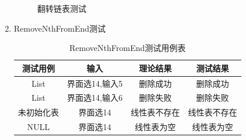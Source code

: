 \documentclass[supercite]{HustGraduPaper}
\theoremstyle{definition}
\begin{document}
\begin{enumerate}
\begin{figure}[htb]
		      \caption{翻转链表测试}
	      \end{figure}
	      \newpage
	\item RemoveNthFromEnd测试
	      \begin{table}[htb]
		      \begin{center}
			      \setlength{\tabcolsep}{2.0mm}
			      \caption{RemoveNthFromEnd测试用例表}
			      \label{table17}
			      \begin{tabular}{|c|c|c|c|}
				      \hline
				      测试用例   & 输入           & 理论结果     & 测试结果     \\
				      \hline
				      \hline
				      List       & 界面选14,输入5 & 删除成功     & 删除成功     \\
				      \hline
				      List       & 界面选14,输入6 & 删除失败     & 删除失败     \\
				      \hline
				      未初始化表 & 界面选14       & 线性表不存在 & 线性表不存在 \\
				      \hline
				      NULL       & 界面选14       & 线性表为空   & 线性表为空   \\
				      \hline
			      \end{tabular}
		      \end{center}
	      \end{table}
	      \begin{figure}[htb]
		      \centering
		      \quad
		      \\

\end{figure}
\end{enumerate}
\end{document}
